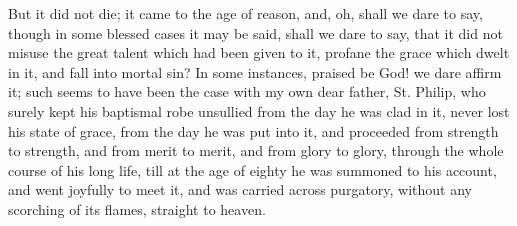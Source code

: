 But it did not die; it came to the age of reason, and, oh, shall we
dare to say, though in some blessed cases it may be said, shall we
dare to say, that it did not misuse the great talent which had been
given to it, profane the grace which dwelt in it, and fall into mortal
sin? In some instances, praised be God! we dare affirm it; such seems
to have been the case with my own dear father, St. Philip, who surely
kept his baptismal robe unsullied from the day he was clad in it,
never lost his state of grace, from the day he was put into it, and
proceeded from strength to strength, and from merit to merit, and from
glory to glory, through the whole course of his long life, till at the
age of eighty he was summoned to his account, and went joyfully to
meet it, and was carried across purgatory, without any scorching of
its flames, straight to heaven.

